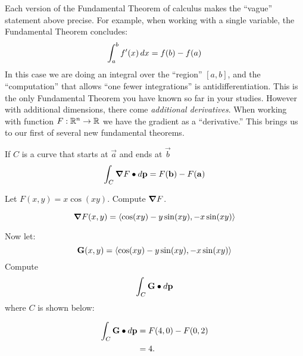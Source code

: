 \documentclass{ximera}
\begin{document}
Each version of the Fundamental Theorem of calculus makes the
``vague'' statement above precise. For example, when working with a
single variable, the Fundamental Theorem concludes:
\[
\int_a^b f'(x) \mathop{}\!d x = f(b) - f(a)
\]
In this case we are doing an integral over the ``region'' $[a,b]$, and
the ``computation'' that allows ``one fewer integrations'' is
antidifferentiation. This is the only Fundamental Theorem you have
known so far in your studies.  However with additional dimensions,
there come \textit{additional derivatives}. When working with function
$F:\mathbb R^n\to\mathbb R$ we have the gradient as a ``derivative.'' This brings us
to our first of several new fundamental theorems.

\begin{theorem}
  If $C$ is a curve that starts at $\vec{a}$ and ends at $\vec{b}$
  \[
  \int_C \boldsymbol\nabla F\bullet \mathop{}\!d \mathbf{p} = F(\mathbf{b}) - F(\mathbf{a})
  \]
\end{theorem}

\begin{question}
  Let $F(x,y) = x\cos(xy)$. Compute $\boldsymbol\nabla F$.
  \begin{prompt}
  \[
  \boldsymbol\nabla F(x,y) = \left\langle \cos(xy) -y\sin(xy), -x\sin(xy)\right\rangle
  \]
  \end{prompt}
  \begin{question}
    Now let:
    \[
    \mathbf{G}(x,y) = \left\langle \cos(xy) -y\sin(xy), -x\sin(xy)\right\rangle
    \]
    Compute
    \[
    \int_C \mathbf G \bullet \mathop{}\!d \mathbf{p}
    \]
    where $C$ is shown below:
    \begin{image}
      \end{image}
      \begin{prompt}
        \begin{align*}
          \int_C \mathbf{G}\bullet \mathop{}\!d \mathbf{p} &= F(4,0) - F(0,2)\\
          &= 4.
        \end{align*}
      \end{prompt}
  \end{question}
\end{question}
\end{document}
